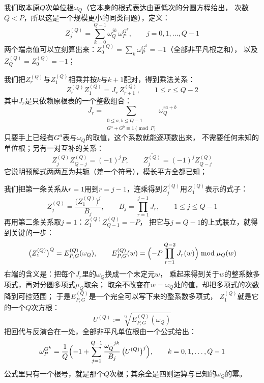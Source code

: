 \documentclass[UTF8,a4paper,11pt]{ctexart}
\begin{document}
我们取本原$Q$次单位根$\omega_Q$（它本身的根式表达由更低次的分圆方程给出，
次数$Q<P$，所以这是一个规模更小的同类问题），定义：
\[
 Z^{(Q)}_j=\sum_{k=0}^{Q-1}\omega_Q^{jk}\,\omega_P^{G^k},\qquad j=0,1,\dots,Q-1
\]
两个端点值可以立刻算出来：$Z^{(Q)}_0=\sum_k\omega_P^{G^k}=-1$（全部非平凡根之和），
以及$Z^{(Q)}_Q=Z^{(Q)}_0=-1$；\par

我们把$Z^{(Q)}_r$与$Z^{(Q)}_1$相乘并按$k$与$k+1$配对，得到乘法关系：
\[
 Z^{(Q)}_r Z^{(Q)}_1=J_r\,Z^{(Q)}_{r+1},\qquad 1\le r\le Q-2
\]
其中$J_r$是只依赖原根表的一个整数组合：
\[
 J_r=\sum_{\substack{0\le a,b\le Q-1\\ G^a+G^b\equiv1\pmod P}}\omega_Q^{r a+b}
\]
只要手上已经有$G^a$表与$\omega_Q$的取值，这个系数就能逐项数出来，
不需要任何未知的单位根；另有一对互补的关系：
\[
 Z^{(Q)}_j Z^{(Q)}_{Q-j}=(-1)^jP,\qquad
 \overline{Z^{(Q)}_j}=(-1)^jZ^{(Q)}_{Q-j}
\]
它说明预解式两两互为共轭（差一个符号），模长平方全都已知；\par

我们把第一条关系从$r=1$用到$r=j-1$，连乘得到$Z^{(Q)}_j$用$Z^{(Q)}_1$表示的式子：
\[
 Z^{(Q)}_j=\frac{\bigl(Z^{(Q)}_1\bigr)^{j}}{B_j},\qquad
 B_j=\prod_{r=1}^{j-1}J_r,\qquad 1\le j\le Q-1
\]
再用第二条关系取$j=1$：$Z^{(Q)}_1Z^{(Q)}_{Q-1}=-P$，
把它与$j=Q-1$的上式联立，就得到关键的一步：
\[
 \bigl(Z^{(Q)}_1\bigr)^{Q}=E^{(Q)}_{P,G}(\omega_Q),\qquad
 E^{(Q)}_{P,G}(w)=\Bigl(-P\prod_{r=1}^{Q-2}J_r(w)\Bigr)\bmod\mu_Q(w)
\]
右端的含义是：把每个$J_r$里的$\omega_Q$换成一个未定元$w$，
乘起来得到关于$w$的整系数多项式，再对分圆多项式$\mu_Q$取余；
取余不改变在$w=\omega_Q$处的值，却把多项式的次数降到可控范围；
于是$E^{(Q)}_{P,G}$是一个完全可以写下来的整系数多项式，
$Z^{(Q)}_1$就是它的一个$Q$次方根：
\[
 U^{(Q)}:=\sqrt[Q]{E^{(Q)}_{P,G}(\omega_Q)}
\]
把回代与反演合在一处，全部非平凡单位根由一个公式给出：
\[
 \omega_P^{G^k}=\frac1Q\Bigl(-1+\sum_{j=1}^{Q-1}\frac{\omega_Q^{-jk}}{B_j}\,\bigl(U^{(Q)}\bigr)^{j}\Bigr),
 \qquad k=0,1,\dots,Q-1
\]
公式里只有一个根号，就是那个$Q$次根；其余全是四则运算与已知的$\omega_Q$的幂。\par
\end{document}
